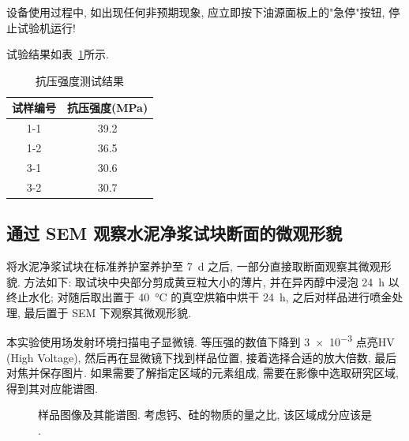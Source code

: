 设备使用过程中, 如出现任何非预期现象, 应立即按下油源面板上的"急停"按钮, 停止试验机运行!

试验结果如表~\ref{tab:compressive_strength_test}所示.

\begin{table}[!t]
  \centering
  \caption{抗压强度测试结果}
  \begin{tabular}{|c|c|}
    \hline
    试样编号 & 抗压强度(\si{\mega\pascal}) \\ \hline
    1-1      & 39.2                        \\ \hline
    1-2      & 36.5                        \\ \hline
    3-1      & 30.6                        \\ \hline
    3-2      & 30.7                        \\ \hline
  \end{tabular}
  \label{tab:compressive_strength_test}
\end{table}

\subsection{通过 SEM 观察水泥净浆试块断面的微观形貌}

将水泥净浆试块在标准养护室养护至 \SI{7}{\day} 之后, 一部分直接取断面观察其微观形貌.
方法如下: 取试块中央部分剪成黄豆粒大小的薄片, 并在异丙醇中浸泡 \SI{24}{\hour} 以终止水化; 对随后取出置于 \SI{40}{\degreeCelsius} 的真空烘箱中烘干 \SI{24}{\hour}, 之后对样品进行喷金处理, 最后置于 SEM 下观察其微观形貌.

本实验使用场发射环境扫描电子显微镜. 等压强的数值下降到 \num{3e-3} 点亮HV (High Voltage), 然后再在显微镜下找到样品位置, 接着选择合适的放大倍数, 最后对焦并保存图片.
如果需要了解指定区域的元素组成, 需要在影像中选取研究区域, 得到其对应能谱图.

\begin{figure}
  \centering
   \quad
  \caption{样品图像及其能谱图. 考虑钙、硅的物质的量之比, 该区域成分应该是  .}
\end{figure}

